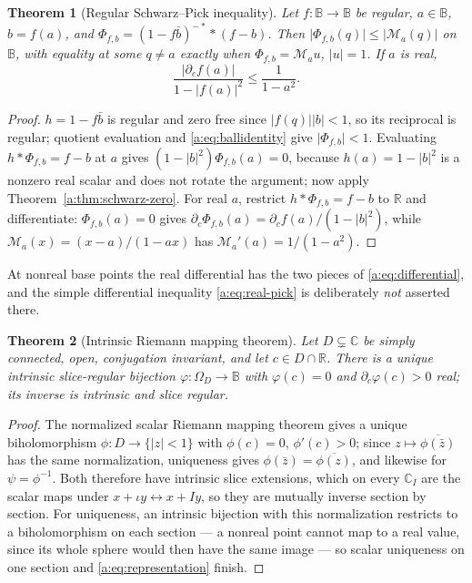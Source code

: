 \documentclass[11pt,a4paper]{article}
\numberwithin{equation}{section}
\newtheorem{theorem}{Theorem}[section]
\theoremstyle{definition}
\theoremstyle{remark}
\theoremstyle{plain}
\newcommand{\RR}{\mathbb R}
\newcommand{\CC}{\mathbb C}
\newcommand{\Om}{\Omega}
\newcommand{\abs}[1]{\lvert #1\rvert}
\begin{document}
\begin{theorem}[Regular Schwarz--Pick inequality]
\label{a:thm:pick}
Let $f:\mathbb B\to\mathbb B$ be regular, $a\in\mathbb B$, $b=f(a)$, and
$\Phi_{f,b}=(1-f\bar b)^{-*}*(f-b)$. Then
$\abs{\Phi_{f,b}(q)}\le\abs{\mathcal M_a(q)}$ on $\mathbb B$, with equality at
some $q\ne a$ exactly when $\Phi_{f,b}=\mathcal M_au$, $\abs u=1$. If $a$ is
real,
\begin{equation}
 \frac{\abs{\partial_cf(a)}}{1-\abs{f(a)}^2}\le\frac1{1-a^2}.
 \label{a:eq:real-pick}
\end{equation}
\end{theorem}

\begin{proof}
$h=1-f\bar b$ is regular and zero free since $\abs{f(q)}\abs b<1$, so its
reciprocal is regular; quotient evaluation and \eqref{a:eq:ballidentity} give
$\abs{\Phi_{f,b}}<1$. Evaluating $h*\Phi_{f,b}=f-b$ at $a$ gives
$(1-\abs b^2)\Phi_{f,b}(a)=0$, because $h(a)=1-\abs b^2$ is a nonzero real
scalar and does not rotate the argument; now apply
Theorem~\ref{a:thm:schwarz-zero}. For real $a$, restrict
$h*\Phi_{f,b}=f-b$ to $\RR$ and differentiate: $\Phi_{f,b}(a)=0$ gives
$\partial_c\Phi_{f,b}(a)=\partial_cf(a)/(1-\abs b^2)$, while
$\mathcal M_a(x)=(x-a)/(1-ax)$ has $\mathcal M_a'(a)=1/(1-a^2)$.
\end{proof}

At nonreal base points the real differential has the two pieces of
\eqref{a:eq:differential}, and the simple differential inequality
\eqref{a:eq:real-pick} is deliberately \emph{not} asserted there.

\begin{theorem}[Intrinsic Riemann mapping theorem]
\label{a:thm:riemann}
Let $D\subsetneq\CC$ be simply connected, open, conjugation invariant, and let
$c\in D\cap\RR$. There is a unique intrinsic slice-regular bijection
$\varphi:\Om_D\to\mathbb B$ with $\varphi(c)=0$ and $\partial_c\varphi(c)>0$
real; its inverse is intrinsic and slice regular.
\end{theorem}

\begin{proof}
The normalized scalar Riemann mapping theorem gives a unique biholomorphism
$\phi:D\to\{\abs z<1\}$ with $\phi(c)=0$, $\phi'(c)>0$; since
$z\mapsto\overline{\phi(\bar z)}$ has the same normalization, uniqueness gives
$\phi(\bar z)=\overline{\phi(z)}$, and likewise for $\psi=\phi^{-1}$. Both
therefore have intrinsic slice extensions, which on every $\CC_I$ are the
scalar maps under $x+\iota y\leftrightarrow x+Iy$, so they are mutually
inverse section by section. For uniqueness, an intrinsic bijection with this
normalization restricts to a biholomorphism on each section --- a nonreal
point cannot map to a real value, since its whole sphere would then have the
same image --- so scalar uniqueness on one section and
\eqref{a:eq:representation} finish.
\end{proof}
\end{document}
